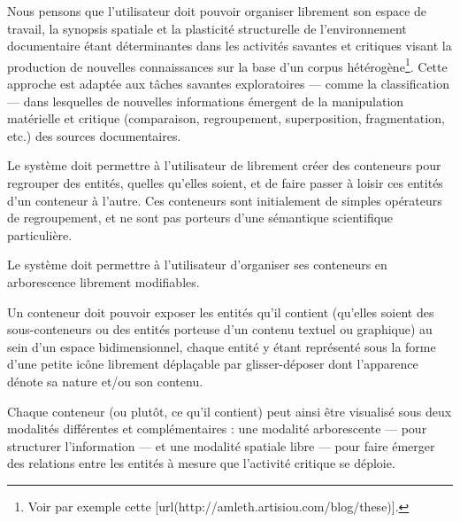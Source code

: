 \startchapter[title={Espace de travail}]

\startsection[title={Organisation et plasticité de l'espace de travail}]

\idea{}
Nous pensons que l'utilisateur doit pouvoir organiser librement son espace de travail, la synopsis spatiale et la plasticité structurelle de l'environnement documentaire étant déterminantes dans les activités savantes et critiques visant la production de nouvelles connaissances sur la base d'un corpus hétérogène\footnote{Voir par exemple cette [url(http://amleth.artisiou.com/blog/these)].}.
Cette approche est adaptée aux tâches savantes exploratoires --- comme la classification --- dans lesquelles de nouvelles informations émergent de la manipulation matérielle et critique (comparaison, regroupement, superposition, fragmentation, etc.) des sources documentaires.

\exig{}
Le système doit permettre à l'utilisateur de librement créer des conteneurs pour regrouper des entités, quelles qu'elles soient, et de faire passer à loisir ces entités d'un conteneur à l'autre.
Ces conteneurs sont initialement de simples opérateurs de regroupement, et ne sont pas porteurs d'une sémantique scientifique particulière.

\exig{}
Le système doit permettre à l'utilisateur d'organiser ses conteneurs en arborescence librement modifiables.

\exig{}
Un conteneur doit pouvoir exposer les entités qu'il contient (qu'elles soient des sous-conteneurs ou des entités porteuse d'un contenu textuel ou graphique) au sein d'un espace bidimensionnel, chaque entité y étant représenté sous la forme d'une petite icône librement déplaçable par glisser-déposer dont l'apparence dénote sa nature et/ou son contenu.

\idea{}
Chaque conteneur (ou plutôt, ce qu'il contient) peut ainsi être visualisé sous deux modalités différentes et complémentaires : une modalité arborescente --- pour structurer l'information --- et une modalité spatiale libre --- pour faire émerger des relations entre les entités à mesure que l'activité critique se déploie.

